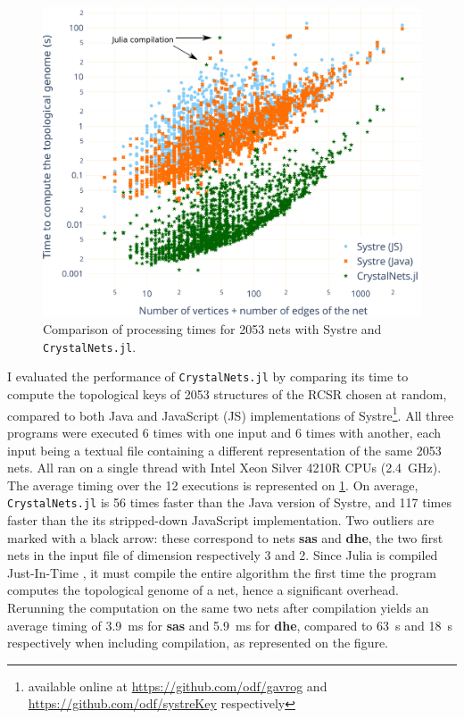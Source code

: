 \documentclass[main.tex]{subfiles}
\begin{document}
\begin{figure}[t]
	\centering
	\includegraphics[width=\linewidth]{figures/topology/timings.pdf}
	\caption{\small Comparison of processing times for \num{2053} nets with Systre and \texttt{CrystalNets.jl}.}
	\label{timings}
\end{figure}

I evaluated the performance of \texttt{CrystalNets.jl} by comparing its time to compute the topological keys of \num{2053} structures of the RCSR chosen at random, compared to both Java and JavaScript (JS) implementations of Systre\footnote{available online at \url{https://github.com/odf/gavrog} and \url{https://github.com/odf/systreKey} respectively}. All three programs were executed 6 times with one input and 6 times with another, each input being a textual file containing a different representation of the same \num{2053} nets. All ran on a single thread with Intel Xeon Silver 4210R CPUs (2.4~GHz). The average timing over the 12 executions is represented on \cref{timings}. On average, \texttt{CrystalNets.jl} is 56 times faster than the Java version of Systre, and 117 times faster than the its stripped-down JavaScript implementation. Two outliers are marked with a black arrow: these correspond to nets {\bf sas} and {\bf dhe}, the two first nets in the input file of dimension respectively 3 and 2. Since Julia is compiled Just-In-Time \autocite{JuliaDesign}, it must compile the entire algorithm the first time the program computes the topological genome of a net, hence a significant overhead. Rerunning the computation on the same two nets after compilation yields an average timing of \qty{3.9}{ms} for {\bf sas} and \qty{5.9}{ms} for {\bf dhe}, compared to \qty{63}{s} and \qty{18}{s} respectively when including compilation, as represented on the figure.
\end{document}
